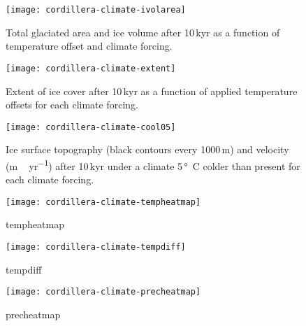 \begin{figure}[t]
	\vspace*{2mm}
	\begin{center}
		\texttt{[image: cordillera-climate-ivolarea]}
	\end{center}
	\caption{Total glaciated area and ice volume after 10\,kyr as a function of temperature offset and climate forcing.}
	\label{fig:ivolarea}
\end{figure}

\begin{figure*}[t]
	\vspace*{2mm}
	\begin{center}
		\texttt{[image: cordillera-climate-extent]}
	\end{center}
	\caption{Extent of ice cover after 10\,kyr as a function of applied temperature offsets for each climate forcing.}
	\label{fig:extent}
\end{figure*}

\begin{figure*}[t]
	\vspace*{2mm}
	\begin{center}
		\texttt{[image: cordillera-climate-cool05]}
	\end{center}
	\caption{Ice surface topography (black contours every 1000\,m) and velocity (\unit{m\,yr^{-1}}) after 10\,kyr under a climate 5\,\unit{\degree C} colder than present for each climate forcing.}
	\label{fig:cool05}
\end{figure*}

\begin{figure}[t]
	\vspace*{2mm}
	\begin{center}
		\texttt{[image: cordillera-climate-tempheatmap]}
	\end{center}
	\caption{tempheatmap}
	\label{fig:tempheatmap}
\end{figure}

\begin{figure}[t]
	\vspace*{2mm}
	\begin{center}
		\texttt{[image: cordillera-climate-tempdiff]}
	\end{center}
	\caption{tempdiff}
	\label{fig:tempdiff}
\end{figure}

\begin{figure}[t]
	\vspace*{2mm}
	\begin{center}
		\texttt{[image: cordillera-climate-precheatmap]}
	\end{center}
	\caption{precheatmap}
	\label{fig:precheatmap}
\end{figure}

